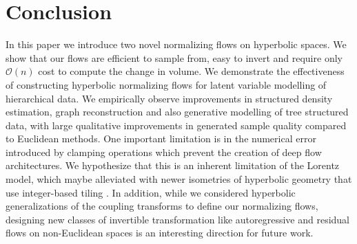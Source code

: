 \section{Conclusion}
In this paper we introduce two novel normalizing flows on hyperbolic spaces. 
We show that our flows are efficient to sample from, easy to invert and require only $\mathcal{O}(n)$ cost to compute the change in volume. We demonstrate the effectiveness of constructing hyperbolic normalizing flows for latent variable modelling of hierarchical data. We empirically observe improvements in structured density estimation, graph reconstruction and also generative modelling of tree structured data, with large qualitative improvements in generated sample quality compared to Euclidean methods. One important limitation is in the numerical error introduced by clamping operations which prevent the creation of deep flow architectures. We hypothesize that this is an inherent limitation of the Lorentz model, which maybe alleviated with newer isometries of hyperbolic geometry that use integer-based tiling \cite{yu2019numerically}. In addition, while we considered hyperbolic generalizations of the coupling transforms to define our normalizing flows, designing new classes of invertible transformation like autoregressive and residual flows on non-Euclidean spaces is an interesting direction for future work.